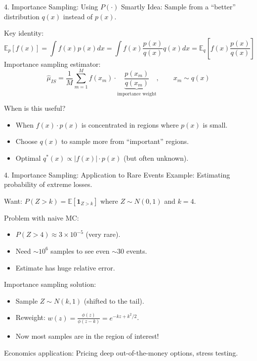 \documentclass[aspectratio=169]{beamer}
\newcommand{\1}{\mathbf{1}}
\begin{document}
\begin{frame}{4. Importance Sampling: Using $P(\cdot)$ Smartly}
\small
Idea: Sample from a ``better'' distribution $q(x)$ instead of $p(x)$.

Key identity:
\[
    \mathbb{E}_p[f(x)] = \int f(x) p(x) dx = \int f(x) \frac{p(x)}{q(x)} q(x) dx = \mathbb{E}_q\left[ f(x) \frac{p(x)}{q(x)} \right]
\]
Importance sampling estimator:
\[
    \hat{\mu}_{IS} = \frac{1}{M}\sum_{m=1}^M f(x_m) \cdot \underbrace{\frac{p(x_m)}{q(x_m)}}_{\text{importance weight}}, \qquad x_m \sim q(x)
\]

When is this useful?
\begin{itemize}\setlength{\itemsep}{1mm}
    \item When $f(x) \cdot p(x)$ is concentrated in regions where $p(x)$ is small.
    \item Choose $q(x)$ to sample more from ``important'' regions.
    \item Optimal $q^*(x) \propto |f(x)| \cdot p(x)$ (but often unknown).
\end{itemize}
\end{frame}

\begin{frame}{4. Importance Sampling: Application to Rare Events}
\small
Example: Estimating probability of extreme losses.

Want: $P(Z > k) = \mathbb{E}[\mathbf{1}_{Z > k}]$ where $Z \sim N(0,1)$ and $k = 4$.

Problem with naive MC:
\begin{itemize}\setlength{\itemsep}{1mm}
    \item $P(Z > 4) \approx 3 \times 10^{-5}$ (very rare).
    \item Need $\sim 10^6$ samples to see even $\sim 30$ events.
    \item Estimate has huge relative error.
\end{itemize}

Importance sampling solution:
\begin{itemize}\setlength{\itemsep}{1mm}
    \item Sample $Z \sim N(k, 1)$ (shifted to the tail).
    \item Reweight: $w(z) = \frac{\phi(z)}{\phi(z-k)} = e^{-kz + k^2/2}$.
    \item Now most samples are in the region of interest!
\end{itemize}

Economics application: Pricing deep out-of-the-money options, stress testing.
\end{frame}
\end{document}
